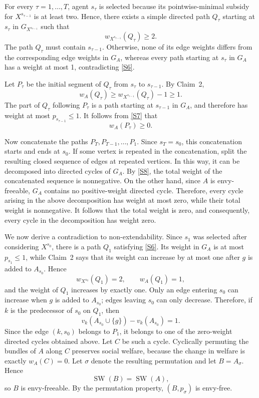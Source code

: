 \documentclass[11pt]{article}
\makeatletter
\theoremstyle{plain}
\theoremstyle{plain}
\renewenvironment{proof}[1][\proofname]{\par
  \pushQED{\qed}%
  \normalfont \topsep6\p@\@plus6\p@\relax
  \trivlist
  \item[\hskip\labelsep\bfseries #1\@addpunct{}]\ignorespaces
}{%
  \popQED\endtrivlist\@endpefalse
}
\makeatother
\begin{document}
\begin{proof}
For every $\tau=1,\ldots,T$, agent $s_\tau$ is selected because its pointwise-minimal subsidy for $X^{s_{\tau-1}}$ is at least two. Hence, there exists a simple directed path $Q_\tau$ starting
at $s_\tau$ in $G_{X^{s_{\tau-1}}}$ such that
\begin{equation}\label{S6}
w_{X^{s_{\tau-1}}}(Q_\tau)\geq2.
\end{equation}
The path $Q_\tau$ must contain $s_{\tau-1}$. Otherwise, none of its edge weights differs from the corresponding edge weights in $G_A$, whereas every path starting at $s_\tau$ in $G_A$ has a weight at most 1, contradicting \eqref{S6}.



Let $P_\tau$ be the initial segment of $Q_\tau$ from $s_\tau$ to $s_{\tau-1}$. By Claim~2,
\begin{equation}\label{S7}
 w_A(Q_\tau)
\geq
w_{X^{s_{\tau-1}}}(Q_\tau)-1
\geq1.
\end{equation}
The part of $Q_\tau$ following $P_\tau$ is a path starting at $s_{\tau-1}$ in $G_A$, and therefore has weight at most $p_{s_{\tau-1}}\leq1$. It follows from \eqref{S7} that
\begin{equation}\label{S8}
w_A(P_\tau)\geq0.
\end{equation}

Now concatenate the paths $P_T,P_{T-1},\ldots,P_1$. Since $s_T=s_0$, this concatenation starts and ends at $s_0$. If some vertex is repeated in the concatenation, split the resulting closed sequence of edges at repeated vertices. In this way, it can be decomposed into directed cycles of $G_A$. By \eqref{S8}, the total weight of the concatenated sequence is nonnegative. On the other hand, since $A$ is envy-freeable, $G_A$ contains no positive-weight directed cycle. Therefore, every cycle arising in the above decomposition has weight at most zero, while their total weight is nonnegative. It follows that the total weight is zero, and consequently, every cycle in the decomposition has weight zero.

We now derive a contradiction to non-extendability. Since $s_1$ was selected after considering $X^{s_0}$, there is a path $Q_1$ satisfying \eqref{S6}. Its weight in $G_A$ is at most $p_{s_1}\leq1$, while Claim~2 says that its weight can increase by at most one after $g$ is added to $A_{s_0}$. Hence
\[
w_{X^{s_0}}(Q_1)=2,
\qquad
w_A(Q_1)=1,
\]
and the weight of $Q_1$ increases by exactly one. Only an edge entering $s_0$ can increase when $g$ is added to $A_{s_0}$; edges leaving $s_0$ can only decrease. Therefore, if $k$ is the predecessor of $s_0$ on $Q_1$, then
\begin{equation}\label{S9}
v_k(A_{s_0}\cup\{g\})-v_k(A_{s_0})=1.
\end{equation}
Since the edge $(k,s_0)$ belongs to $P_1$, it belongs to one of the zero-weight directed cycles obtained above. Let $C$ be such a cycle. Cyclically permuting the bundles of $A$ along $C$ preserves social welfare, because the change in welfare is exactly $w_A(C)=0$. Let $\sigma$ denote the resulting permutation and let $B=A_\sigma$. Hence
\[
\operatorname{SW}(B)=\operatorname{SW}(A),
\] so $B$ is envy-freeable. By the permutation property, $(B,p_\sigma)$ is envy-free.


\end{proof}
\end{document}
